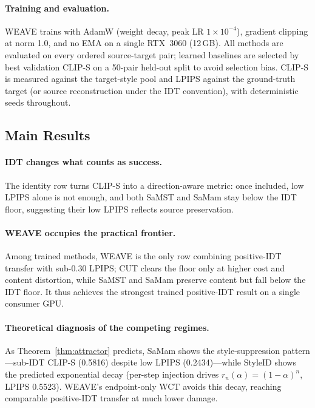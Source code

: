 \documentclass[letterpaper]{article}
\begin{document}
\paragraph{Training and evaluation.}
WEAVE trains with AdamW (weight decay, peak LR $1{\times}10^{-4}$), gradient clipping at norm 1.0, and no EMA on a single RTX~3060 (12\,GB).
All methods are evaluated on every ordered source-target pair; learned baselines are selected by best validation CLIP-S on a 50-pair held-out split to avoid selection bias.
CLIP-S is measured against the target-style pool and LPIPS against the ground-truth target (or source reconstruction under the IDT convention), with deterministic seeds throughout.






\subsection{Main Results}

\paragraph{IDT changes what counts as success.}
The identity row turns CLIP-S into a direction-aware metric: once included, low LPIPS alone is not enough, and both SaMST and SaMam stay below the IDT floor, suggesting their low LPIPS reflects source preservation.

\paragraph{WEAVE occupies the practical frontier.}
Among trained methods, WEAVE is the only row combining positive-IDT transfer with sub-0.30 LPIPS; CUT clears the floor only at higher cost and content distortion, while SaMST and SaMam preserve content but fall below the IDT floor.
It thus achieves the strongest trained positive-IDT result on a single consumer GPU.



\paragraph{Theoretical diagnosis of the competing regimes.}
As Theorem~\ref{thm:attractor} predicts, SaMam shows the style-suppression pattern---sub-IDT CLIP-S (0.5816) despite low LPIPS (0.2434)---while StyleID shows the predicted exponential decay (per-step injection drives $r_n(\alpha)=(1-\alpha)^n$, LPIPS 0.5523).
WEAVE's endpoint-only WCT avoids this decay, reaching comparable positive-IDT transfer at much lower damage.
\end{document}
